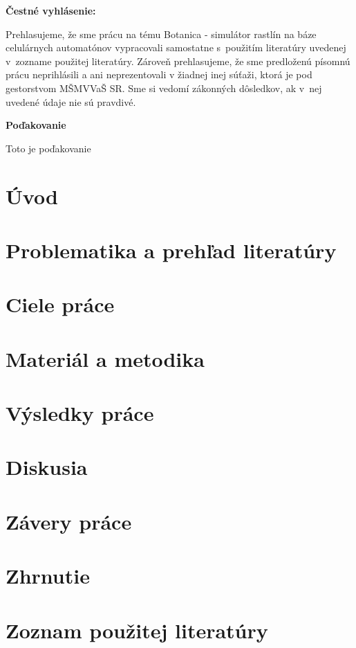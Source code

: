 \documentclass[12pt]{article}
\def\nazovprace{Botanica - simulátor rastlín na báze celulárnych automatónov}
\begin{document}
\setcounter{page}{3}

%
%

\thispagestyle{empty}

\noindent
\textbf{Čestné vyhlásenie:}

\noindent
Prehlasujeme, že sme prácu na tému
\nazovprace \space
vypracovali samostatne s~použitím literatúry uvedenej v~zozname použitej literatúry.
Zároveň prehlasujeme, že sme predloženú písomnú prácu neprihlásili a ani neprezentovali
v žiadnej inej súťaži, ktorá je pod gestorstvom MŠMVVaŠ SR. Sme si vedomí zákonných dôsledkov,
ak v~nej uvedené údaje nie sú pravdivé.

\newpage


%
%

\thispagestyle{empty}

\null
\vfill

\noindent
\textbf{Poďakovanie}

\noindent
Toto je poďakovanie

\vspace{8cm}
\newpage


%
%

\thispagestyle{empty}
\tableofcontents
\newpage


%
%

\section*{Úvod}

\section{Problematika a prehľad literatúry}
\section{Ciele práce}
\section{Materiál a metodika}
\section{Výsledky práce}
\section{Diskusia}
\section{Závery práce}
\section{Zhrnutie}
\section{Zoznam použitej literatúry}
\end{document}
